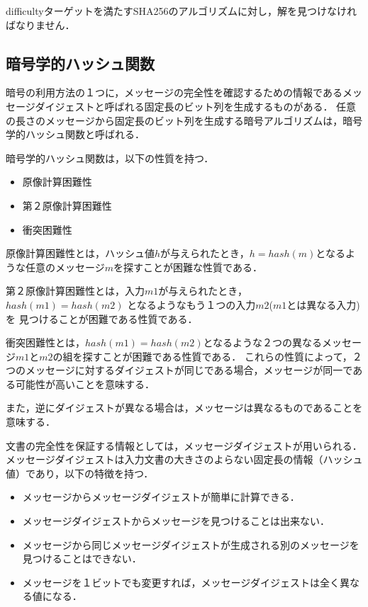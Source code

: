 \documentclass[a4paper,12pt]{jsarticle}
\begin{document}
difficultyターゲットを満たすSHA256のアルゴリズムに対し，解を見つけなければなりません．

      \subsection{暗号学的ハッシュ関数} %

暗号の利用方法の１つに，メッセージの完全性を確認するための情報であるメッセージダイジェストと呼ばれる固定長のビット列を生成するものがある．
任意の長さのメッセージから固定長のビット列を生成する暗号アルゴリズムは，暗号学的ハッシュ関数と呼ばれる．

暗号学的ハッシュ関数は，以下の性質を持つ．
\begin{itemize}
  \item 原像計算困難性
  \item 第２原像計算困難性
  \item 衝突困難性
\end{itemize}

原像計算困難性とは，ハッシュ値$h$が与えられたとき，$ h = hash(m)$となるような任意のメッセージ$m$を探すことが困難な性質である．

第２原像計算困難性とは，入力$m1$が与えられたとき，$ hash(m1) = hash(m2)$ となるようなもう１つの入力$m2$($m1$とは異なる入力)を
見つけることが困難である性質である．

衝突困難性とは，$hash(m1)= hash(m2)$となるような２つの異なるメッセージ$m1$と$m2$の組を探すことが困難である性質である．
これらの性質によって，２つのメッセージに対するダイジェストが同じである場合，メッセージが同一である可能性が高いことを意味する．

また，逆にダイジェストが異なる場合は，メッセージは異なるものであることを意味する．

文書の完全性を保証する情報としては，メッセージダイジェストが用いられる．
メッセージダイジェストは入力文書の大きさのよらない固定長の情報（ハッシュ値）であり，以下の特徴を持つ．

\begin{itemize}
  \item メッセージからメッセージダイジェストが簡単に計算できる．
  \item メッセージダイジェストからメッセージを見つけることは出来ない．
  \item メッセージから同じメッセージダイジェストが生成される別のメッセージを見つけることはできない．
  \item メッセージを１ビットでも変更すれば，メッセージダイジェストは全く異なる値になる．
\end{itemize}
\end{document}
